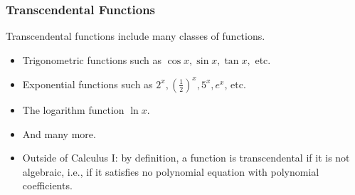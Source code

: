 \begin{frame}
\frametitle{Transcendental Functions}
Transcendental functions include many classes of functions.
\begin{itemize}
\item<2->  Trigonometric functions such as $\cos x, \sin x, \tan x,$ etc.
\item<3->  Exponential functions such as $2^x, \left( \frac{1}{2}\right)^x, 5^x, e^x$, etc.
\item<4->  The logarithm function $\ln x$.
\item<5->  And many more.
\item<6-> Outside of Calculus I: by definition, a function is transcendental if it is not algebraic, i.e., if it satisfies no polynomial equation with polynomial coefficients.
\end{itemize}
\end{frame}
